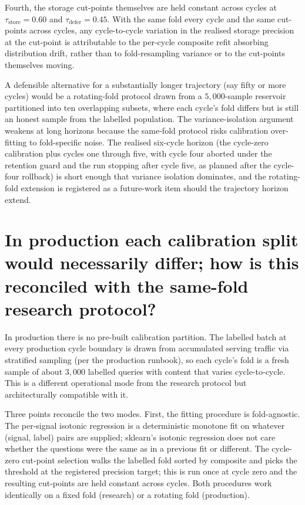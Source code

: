 Fourth, the storage cut-points themselves are held constant across cycles at $\tau_{\text{store}} = 0.60$ and $\tau_{\text{defer}} = 0.45$. With the same fold every cycle and the same cut-points across cycles, any cycle-to-cycle variation in the realised storage precision at the cut-point is attributable to the per-cycle composite refit absorbing distribution drift, rather than to fold-resampling variance or to the cut-points themselves moving.

A defensible alternative for a substantially longer trajectory (say fifty or more cycles) would be a rotating-fold protocol drawn from a $5{,}000$-sample reservoir partitioned into ten overlapping subsets, where each cycle's fold differs but is still an honest sample from the labelled population. The variance-isolation argument weakens at long horizons because the same-fold protocol risks calibration over-fitting to fold-specific noise. The realised six-cycle horizon (the cycle-zero calibration plus cycles one through five, with cycle four aborted under the retention guard and the run stopping after cycle five, as planned after the cycle-four rollback) is short enough that variance isolation dominates, and the rotating-fold extension is registered as a future-work item should the trajectory horizon extend.


\section[Production vs research fold]{In production each calibration split would necessarily differ; how is this reconciled with the same-fold research protocol?}
\label{app:qa-production-fold}

In production there is no pre-built calibration partition. The labelled batch at every production cycle boundary is drawn from accumulated serving traffic via stratified sampling (per the production runbook), so each cycle's fold is a fresh sample of about $3{,}000$ labelled queries with content that varies cycle-to-cycle. This is a different operational mode from the research protocol but architecturally compatible with it.

Three points reconcile the two modes. First, the fitting procedure is fold-agnostic. The per-signal isotonic regression is a deterministic monotone fit on whatever (signal, label) pairs are supplied; sklearn's isotonic regression does not care whether the questions were the same as in a previous fit or different. The cycle-zero cut-point selection walks the labelled fold sorted by composite and picks the threshold at the registered precision target; this is run once at cycle zero and the resulting cut-points are held constant across cycles. Both procedures work identically on a fixed fold (research) or a rotating fold (production).

